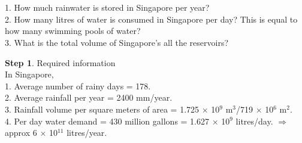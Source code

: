 \documentclass[11pt]{exam}
\begin{document}
\begin{questions}
{\begin{minipage}{42em}
                       
\end{minipage}} \\ \\


\question
\label{Q23: Rainwater catchment and water consumption by Singapore}
1. How much rainwater is stored in Singapore per year? \\ 
2. How many litres of water is consumed in Singapore per day? This is equal to how many     swimming pools of water?\\
3. What is the total volume of Singapore's all the reservoirs?

\textbf{Step 1}. Required information \\
                 In Singapore, \\
                 1. Average number of rainy days = 178. \\
                 2. Average rainfall per year = 2400 mm/year. \\
                 3. Rainfall volume per square meters of area  = 1.725 $\times$ 10$^{9}$ m$^{3}$/719 $\times$ 10$^{6}$ m$^{2}$.\\ 
                 4. Per day water demand = 430 million gallons = 1.627 $\times$ 10$^{9}$ litres/day. $\Rightarrow$ approx 6 $\times$ 10$^{11}$ litres/year. 
                \\ \\
                

\end{questions}
\end{document}
